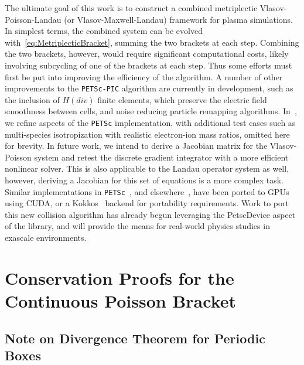 \documentclass[preprint,12pt]{elsarticle}
\theoremstyle{definition}
\begin{document}
The ultimate goal of this work is to construct a combined metriplectic Vlasov-Poisson-Landau (or Vlasov-Maxwell-Landau) framework for plasma simulations. In simplest terms, the combined system can be evolved with~\eqref{eq:MetriplecticBracket}, summing the two brackets at each step. Combining the two brackets, however, would require significant computational costs, likely involving subcycling of one of the brackets at each step. Thus some efforts must first be put into improving the efficiency of the algorithm. A number of other improvements to the \texttt{PETSc-PIC} algorithm are currently in development, such as the inclusion of $H(div)$ finite elements, which preserve the electric field smoothness between cells, and noise reducing particle remapping algorithms. In~\cite{pusztay2023landaucollisionintegralparticle}, we refine aspects of the \texttt{PETSc} implementation, with additional test cases such as multi-species isotropization with realistic electron-ion mass ratios, omitted here for brevity.
In future work, we intend to derive a Jacobian matrix for the Vlasov-Poisson system and retest the discrete gradient integrator with a more efficient nonlinear solver. This is also applicable to the Landau operator system as well, however, deriving a Jacobian for this set of equations is a more complex task. Similar implementations in \texttt{PETSc}~\cite{Adams2017}, and elsewhere~\cite{Zonta2022}, have been ported to GPUs using CUDA, or a Kokkos~\cite{Kokkos2014} backend for portability requirements. Work to port this new collision algorithm has already begun leveraging the PetscDevice aspect of the library, and will provide the means for real-world physics studies in exascale environments.


\appendix

\section{Conservation Proofs for the Continuous Poisson Bracket} \label{sec:AppendixA}

\subsection{Note on Divergence Theorem for Periodic Boxes}
\end{document}
